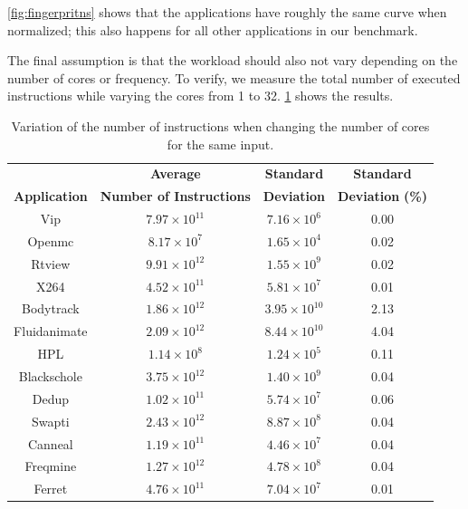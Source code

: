 \cref{fig:fingerpritns} shows that the applications have roughly the same curve when normalized; this also happens for all other applications in our benchmark.

The final assumption is that the workload should also not vary depending on the number of cores or frequency. To verify, we measure the total number of executed instructions while varying the cores from 1 to 32. \cref{tab:cores_variation} shows the results.

\begin{table}[H]
	\centering
	\caption{Variation of the number of instructions when changing the number of cores for the same input.}
	\begin{tabular*}{\hsize}{@{\extracolsep{\fill}}cccc}
		\toprule
		& \textbf{Average} & \textbf{Standard}     & \textbf{Standard}\\
		\multirow{-2}{*}{\textbf{Application}}& \textbf{Number of Instructions} & \textbf{Deviation}     & \textbf{Deviation} \textbf{(\%) }\\ \midrule
		Vip          & $7.97 \times 10^{11}$     & $7.16 \times 10^{6}$  & 0.00 \\ %
		Openmc       & $8.17 \times 10^{7}$     & $ 1.65 \times 10^{4}$ & 0.02    \\ 
		Rtview       & $9.91 \times 10^{12}$     & $ 1.55 \times 10^{9}$ & 0.02    \\ 
		X264         & $4.52 \times 10^{11}$     & $ 5.81 \times 10^{7}$ & 0.01    \\ 
		Bodytrack    & $1.86 \times 10^{12}$     & $ 3.95 \times 10^{10}$ & 2.13    \\ 
		Fluidanimate & $2.09 \times 10^{12}$     & $ 8.44 \times 10^{10}$ & 4.04    \\ 
		HPL          & $1.14 \times 10^{8}$      & $ 1.24 \times 10^{5}$ & 0.11    \\ 
		Blackschole  & $3.75 \times 10^{12}$     & $ 1.40 \times 10^{9}$ & 0.04     \\ 
		Dedup        & $1.02 \times 10^{11}$     & $ 5.74 \times 10^{7}$ & 0.06     \\ 
		Swapti       & $2.43 \times 10^{12}$     & $ 8.87 \times 10^{8}$ & 0.04     \\ 
		Canneal      & $1.19 \times 10^{11}$     & $ 4.46 \times 10^{7}$ & 0.04     \\ 
		Freqmine     & $1.27 \times 10^{12}$     & $ 4.78 \times 10^{8}$ & 0.04     \\ 
		Ferret       & $4.76 \times 10^{11}$     & $ 7.04 \times 10^{7}$ & 0.01     \\ \bottomrule
	\end{tabular*}
	\label{tab:cores_variation}
\end{table}

